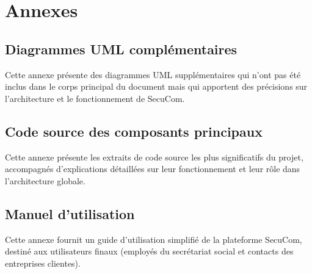 \documentclass[12pt,a4paper,oneside]{memoir}
\begin{document}





\tableofcontents
\newpage

\listoffigures
\newpage

\listoftables
\newpage

























\appendix
\chapter{Annexes}
\section{Diagrammes UML complémentaires}
Cette annexe présente des diagrammes UML supplémentaires qui n'ont pas été inclus dans le corps principal du document mais qui apportent des précisions sur l'architecture et le fonctionnement de SecuCom.

\section{Code source des composants principaux}
Cette annexe présente les extraits de code source les plus significatifs du projet, accompagnés d'explications détaillées sur leur fonctionnement et leur rôle dans l'architecture globale.

\section{Manuel d'utilisation}
Cette annexe fournit un guide d'utilisation simplifié de la plateforme SecuCom, destiné aux utilisateurs finaux (employés du secrétariat social et contacts des entreprises clientes).
\end{document}
